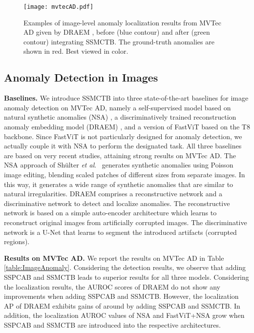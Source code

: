 \documentclass[10pt,journal,compsoc]{IEEEtran}
\newcommand{\etal}{\textit{et al}.}
\begin{document}
\begin{figure}[t!]
\begin{center}
\centerline{\texttt{[image: mvtecAD.pdf]}}
\vspace{-0.2cm}
\caption{Examples of image-level anomaly localization results from MVTec AD given by DRAEM \cite{Zavrtanik-ICCV-2021}, before (blue contour) and after (green contour) integrating SSMCTB. The ground-truth anomalies are shown in red. Best viewed in color.}
\label{fig_results_MVtec}
\vspace{-0.2cm}
\end{center}
\end{figure}

\subsection{Anomaly Detection in Images}

\noindent
\textbf{Baselines.}
We introduce SSMCTB into three state-of-the-art baselines for image anomaly detection on MVTec AD, namely a self-supervised model based on natural synthetic anomalies (NSA) \cite{Schulter-ECCV-2022}, a discriminatively trained reconstruction anomaly embedding model (DRAEM) \cite{Zavrtanik-ICCV-2021}, and a version of FastViT \cite{Vasu-ICCV-2023} based on the T8 backbone. Since FastViT \cite{Vasu-ICCV-2023} is not particularly designed for anomaly detection, we actually couple it with NSA \cite{Schulter-ECCV-2022} to perform the designated task. All three baselines are based on very recent studies, attaining strong results on MVTec AD. 
The NSA approach of Sh\"{u}lter \etal~\cite{Schulter-ECCV-2022} generates synthetic anomalies using Poisson image editing, blending scaled patches of different sizes from separate images. In this way, it generates a wide range of synthetic anomalies that are similar to natural irregularities. 
DRAEM \cite{Zavrtanik-ICCV-2021} comprises a reconstructive network and a discriminative network to detect and localize anomalies. The reconstructive network is based on a simple auto-encoder architecture which learns to reconstruct original images from artificially corrupted images. The discriminative network is a U-Net that learns to segment the introduced artifacts (corrupted regions).

\noindent
\textbf{Results on MVTec AD.}
We report the results on MVTec AD in Table \ref{table:ImageAnomaly}. Considering the detection results, we observe that adding SSPCAB and SSMCTB leads to superior results for all three models. Considering the localization results, the AUROC scores of DRAEM do not show any improvements when adding SSPCAB and SSMCTB. However, the localization AP of DRAEM exhibits gains of around  by adding SSPCAB and SSMCTB. In addition, the localization AUROC values of NSA and FastViT+NSA grow when SSPCAB and SSMCTB are introduced into the respective architectures.
\end{document}
